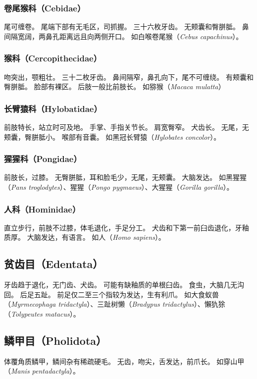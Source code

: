 \documentclass[11pt]{article}
\begin{document}
\subsubsection{卷尾猴科（Cebidae）}
尾可缠卷。
尾端下部有无毛区，司抓握。
三十六枚牙齿。
无颊囊和臀胼胝。
鼻间隔宽阔，两鼻孔距离远且向两侧开口。
如白喉卷尾猴（\textit{Cebus capachinus}）。

\subsubsection{猴科（Cercopithecidae）}
吻突出，颚粗壮。
三十二枚牙齿。
鼻间隔窄，鼻孔向下，尾不可缠绕。
有颊囊和臀胼胝。
脸部有裸区。
后肢一般比前肢长。
如猕猴（\textit{Macaca mulatta}）

\subsubsection{长臂猿科（Hylobatidae）}
前肢特长，站立时可及地。
手掌、手指关节长。
肩宽臀窄。
犬齿长。
无尾，无颊囊，臀胼胝小。
喉部有音囊。
如黑冠长臂猿（\textit{Hylobates concolor}）。

\subsubsection{猩猩科（Pongidae）}
前肢长，过膝。
无臀胼胝，耳和脸毛少，无尾，无颊囊。
大脑发达。
如黑猩猩（\textit{Pans troglodytes}）、猩猩（\textit{Pongo pygmaeus}）、大猩猩（\textit{Gorilla gorilla}）。

\subsubsection{人科（Hominidae）}
直立步行，前肢不过膝，体毛退化，手足分工。
犬齿和下第一前臼齿退化，牙釉质厚。
大脑发达，有语言。
如人（\textit{Homo sapiens}）。

\subsection{贫齿目（Edentata）}
牙齿趋于退化，无门齿、犬齿。
可能有缺釉质的单根臼齿。
食虫，大脑几无沟回。
后足五趾。
前足仅二至三个指较为发达，生有利爪。
如大食蚁兽（\textit{Myrmecophaga tridactyla}）、三趾树懒（\textit{Bradypus tridactylus}）、懶犰狳（\textit{Tolypeutes matacus}）。

\subsection{鳞甲目（Pholidota）}
体覆角质鳞甲，鳞间杂有稀疏硬毛。
无齿，吻尖，舌发达，前爪长。
如穿山甲（\textit{Manis pentadactyla}）。
\end{document}
